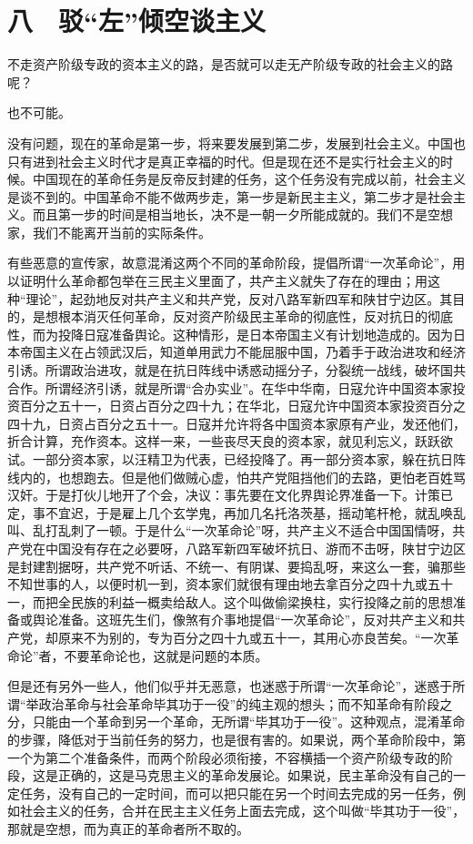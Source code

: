 \section{八　驳“左”倾空谈主义}

不走资产阶级专政的资本主义的路，是否就可以走无产阶级专政的社会主义的路呢？

也不可能。

没有问题，现在的革命是第一步，将来要发展到第二步，发展到社会主义。中国也只有进到社会主义时代才是真正幸福的时代。但是现在还不是实行社会主义的时候。中国现在的革命任务是反帝反封建的任务，这个任务没有完成以前，社会主义是谈不到的。中国革命不能不做两步走，第一步是新民主主义，第二步才是社会主义。而且第一步的时间是相当地长，决不是一朝一夕所能成就的。我们不是空想家，我们不能离开当前的实际条件。

有些恶意的宣传家，故意混淆这两个不同的革命阶段，提倡所谓“一次革命论”，用以证明什么革命都包举在三民主义里面了，共产主义就失了存在的理由；用这种“理论”，起劲地反对共产主义和共产党，反对八路军新四军和陕甘宁边区。其目的，是想根本消灭任何革命，反对资产阶级民主革命的彻底性，反对抗日的彻底性，而为投降日寇准备舆论。这种情形，是日本帝国主义有计划地造成的。因为日本帝国主义在占领武汉后，知道单用武力不能屈服中国，乃着手于政治进攻和经济引诱。所谓政治进攻，就是在抗日阵线中诱惑动摇分子，分裂统一战线，破坏国共合作。所谓经济引诱，就是所谓“合办实业”。在华中华南，日寇允许中国资本家投资百分之五十一，日资占百分之四十九；在华北，日寇允许中国资本家投资百分之四十九，日资占百分之五十一。日寇并允许将各中国资本家原有产业，发还他们，折合计算，充作资本。这样一来，一些丧尽天良的资本家，就见利忘义，跃跃欲试。一部分资本家，以汪精卫为代表，已经投降了。再一部分资本家，躲在抗日阵线内的，也想跑去。但是他们做贼心虚，怕共产党阻挡他们的去路，更怕老百姓骂汉奸。于是打伙儿地开了个会，决议：事先要在文化界舆论界准备一下。计策已定，事不宜迟，于是雇上几个玄学鬼，再加几名托洛茨基，摇动笔杆枪，就乱唤乱叫、乱打乱刺了一顿。于是什么“一次革命论”呀，共产主义不适合中国国情呀，共产党在中国没有存在之必要呀，八路军新四军破坏抗日、游而不击呀，陕甘宁边区是封建割据呀，共产党不听话、不统一、有阴谋、要捣乱呀，来这么一套，骗那些不知世事的人，以便时机一到，资本家们就很有理由地去拿百分之四十九或五十一，而把全民族的利益一概卖给敌人。这个叫做偷梁换柱，实行投降之前的思想准备或舆论准备。这班先生们，像煞有介事地提倡“一次革命论”，反对共产主义和共产党，却原来不为别的，专为百分之四十九或五十一，其用心亦良苦矣。“一次革命论”者，不要革命论也，这就是问题的本质。

但是还有另外一些人，他们似乎并无恶意，也迷惑于所谓“一次革命论”，迷惑于所谓“举政治革命与社会革命毕其功于一役”的纯主观的想头；而不知革命有阶段之分，只能由一个革命到另一个革命，无所谓“毕其功于一役”。这种观点，混淆革命的步骤，降低对于当前任务的努力，也是很有害的。如果说，两个革命阶段中，第一个为第二个准备条件，而两个阶段必须衔接，不容横插一个资产阶级专政的阶段，这是正确的，这是马克思主义的革命发展论。如果说，民主革命没有自己的一定任务，没有自己的一定时间，而可以把只能在另一个时间去完成的另一任务，例如社会主义的任务，合并在民主主义任务上面去完成，这个叫做“毕其功于一役”，那就是空想，而为真正的革命者所不取的。


